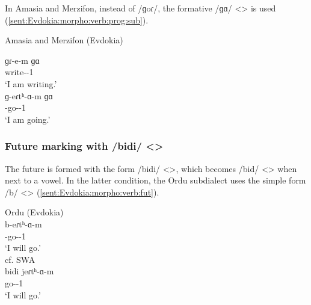 In Amasia and Merzifon, instead of /ɡoɾ/, the formative /ɡɑ/ <> is used (\ref{sent:Evdokia:morpho:verb:prog:sub}).

\begin{exe}
	\ex Amasia and Merzifon (Evdokia) \label{sent:Evdokia:morpho:verb:prog:sub} 
	\begin{xlist}
		\ex \gll ɡɾ-e-m ɡɑ \\
		write-{\thgloss}-1{\sg} {\prog} \\
		\trans `I am writing.'\\
		\ex \gll ɡ-eɾtʰ-ɑ-m ɡɑ \\
		{\ind}-go-{\thgloss}-1{\sg} {\prog} \\
		\trans `I am going.'\\
		
	\end{xlist}
\end{exe}

\subsubsection{Future marking with /bidi/ <>}
The future is formed with the form /bidi/ <>, which becomes /bid/ <> when next to a vowel. In the latter condition, the Ordu subdialect uses the simple form /b/ <> (\ref{sent:Evdokia:morpho:verb:fut}). 






\begin{exe}
	\ex\label{sent:Evdokia:morpho:verb:fut} \begin{xlist}
		\ex Ordu (Evdokia) \\
		\gll b-eɾtʰ-ɑ-m \\
		{\fut}-go-{\thgloss}-1{\sg} \\
		\trans `I will go.'\\
		\armenian{բէրթամ}
		\ex cf. SWA \\
		 \gll bidi jeɾtʰ-ɑ-m \\
			{\fut} go-{\thgloss}-1{\sg} \\
			\trans `I will go.'\\
			\armenian{պիտի երթամ}
			 
		
	\end{xlist}
\end{exe}
